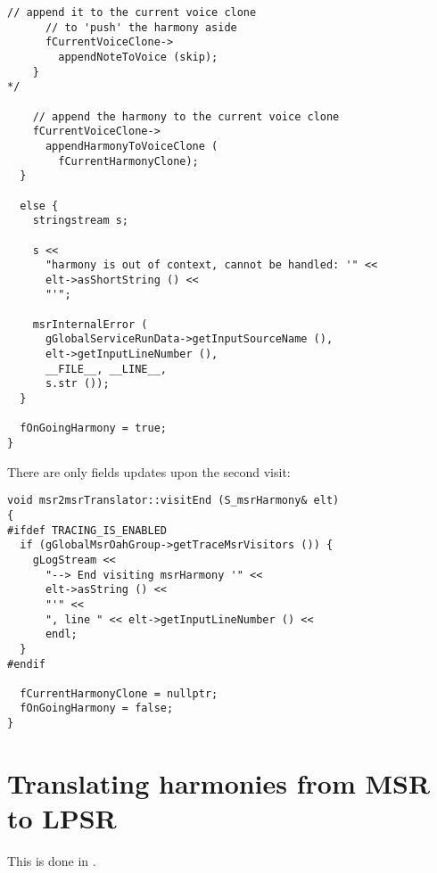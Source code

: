 \begin{lstlisting}[language=CPlusPlus]
      // append it to the current voice clone
      // to 'push' the harmony aside
      fCurrentVoiceClone->
        appendNoteToVoice (skip);
    }
*/

    // append the harmony to the current voice clone
    fCurrentVoiceClone->
      appendHarmonyToVoiceClone (
        fCurrentHarmonyClone);
  }

  else {
    stringstream s;

    s <<
      "harmony is out of context, cannot be handled: '" <<
      elt->asShortString () <<
      "'";

    msrInternalError (
      gGlobalServiceRunData->getInputSourceName (),
      elt->getInputLineNumber (),
      __FILE__, __LINE__,
      s.str ());
  }

  fOnGoingHarmony = true;
}
\end{lstlisting}

There are only fields updates upon the second visit:
\begin{lstlisting}[language=CPlusPlus]
void msr2msrTranslator::visitEnd (S_msrHarmony& elt)
{
#ifdef TRACING_IS_ENABLED
  if (gGlobalMsrOahGroup->getTraceMsrVisitors ()) {
    gLogStream <<
      "--> End visiting msrHarmony '" <<
      elt->asString () <<
      "'" <<
      ", line " << elt->getInputLineNumber () <<
      endl;
  }
#endif

  fCurrentHarmonyClone = nullptr;
  fOnGoingHarmony = false;
}
\end{lstlisting}


\section{Translating harmonies from MSR to LPSR}

This is done in \msrToLpsr{}.

